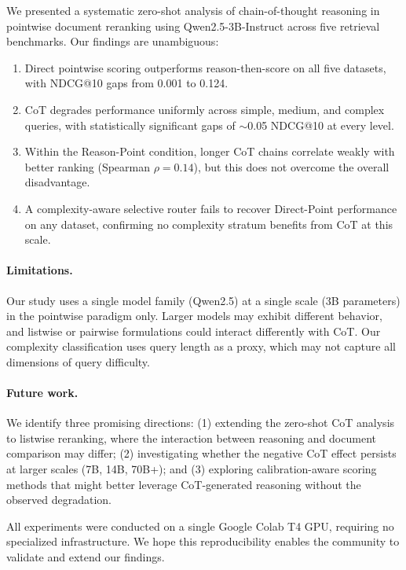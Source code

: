 \documentclass[sigconf,review]{acmart}
\begin{document}
We presented a systematic zero-shot analysis of chain-of-thought reasoning in pointwise document reranking using Qwen2.5-3B-Instruct across five retrieval benchmarks. Our findings are unambiguous:

\begin{enumerate}
    \item Direct pointwise scoring outperforms reason-then-score on all five datasets, with NDCG@10 gaps from 0.001 to 0.124.
    \item CoT degrades performance uniformly across simple, medium, and complex queries, with statistically significant gaps of $\sim$0.05 NDCG@10 at every level.
    \item Within the Reason-Point condition, longer CoT chains correlate weakly with better ranking (Spearman $\rho = 0.14$), but this does not overcome the overall disadvantage.
    \item A complexity-aware selective router fails to recover Direct-Point performance on any dataset, confirming no complexity stratum benefits from CoT at this scale.
\end{enumerate}

\paragraph{Limitations.}
Our study uses a single model family (Qwen2.5) at a single scale (3B parameters) in the pointwise paradigm only. Larger models may exhibit different behavior, and listwise or pairwise formulations could interact differently with CoT. Our complexity classification uses query length as a proxy, which may not capture all dimensions of query difficulty.

\paragraph{Future work.}
We identify three promising directions: (1) extending the zero-shot CoT analysis to listwise reranking, where the interaction between reasoning and document comparison may differ; (2) investigating whether the negative CoT effect persists at larger scales (7B, 14B, 70B+); and (3) exploring calibration-aware scoring methods that might better leverage CoT-generated reasoning without the observed degradation.

All experiments were conducted on a single Google Colab T4 GPU, requiring no specialized infrastructure. We hope this reproducibility enables the community to validate and extend our findings.



\end{document}
